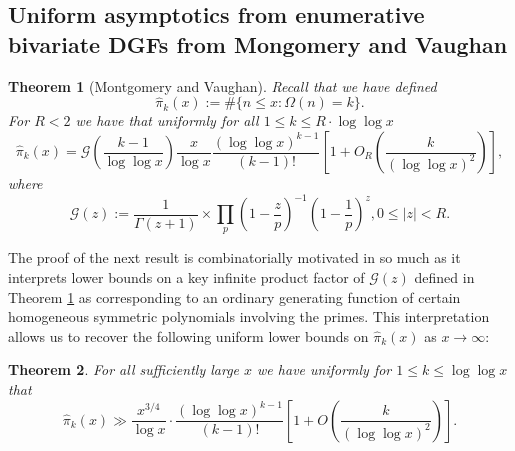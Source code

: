 \documentclass[11pt,reqno,a4letter]{article}
\numberwithin{figure}{section}
\numberwithin{table}{section}
\theoremstyle{plain}
\newtheorem{theorem}{Theorem}
\numberwithin{theorem}{section}
\theoremstyle{definition}
\begin{document}
\subsection{Uniform asymptotics from enumerative bivariate DGFs from Mongomery and Vaughan} 

\begin{theorem}[Montgomery and Vaughan]
\label{theorem_HatPi_ExtInTermsOfGz} 
Recall that we have defined 
$$\widehat{\pi}_k(x) := \#\{n \leq x: \Omega(n)=k\}.$$ 
For $R < 2$ we have that uniformly for all $1 \leq k \leq R \cdot \log\log x$ 
\[
\widehat{\pi}_k(x) = \mathcal{G}\left(\frac{k-1}{\log\log x}\right) \frac{x}{\log x} 
     \frac{(\log\log x)^{k-1}}{(k-1)!} \left[1 + O_R\left(\frac{k}{(\log\log x)^2}\right)\right], 
\]
where 
\[
\mathcal{G}(z) := \frac{1}{\Gamma(z+1)} \times 
     \prod_p \left(1-\frac{z}{p}\right)^{-1} \left(1-\frac{1}{p}\right)^z, 0 \leq |z| < R. 
\]
\end{theorem} 

The proof of the next result is combinatorially motivated in so much as it interprets 
lower bounds on a key infinite product factor of $\mathcal{G}(z)$ defined in 
Theorem \ref{theorem_HatPi_ExtInTermsOfGz} 
as corresponding to an ordinary generating function of certain 
homogeneous symmetric polynomials involving the primes. This interpretation allows us to recover the 
following uniform lower bounds on $\widehat{\pi}_k(x)$ as $x \rightarrow \infty$: 

\begin{theorem} 
\label{theorem_GFs_SymmFuncs_SumsOfRecipOfPowsOfPrimes} 
\label{cor_BoundsOnGz_FromMVBook_initial_stmt_v1} 
For all sufficiently large $x$ we have uniformly for $1 \leq k \leq \log\log x$ that 
\[
\widehat{\pi}_k(x) \gg 
     \frac{x^{3/4}}{\log x} \cdot 
     \frac{(\log\log x)^{k-1}}{(k-1)!} \left[1 + 
     O\left(\frac{k}{(\log\log x)^2}\right)\right]. 
\]
\end{theorem} 
\end{document}
